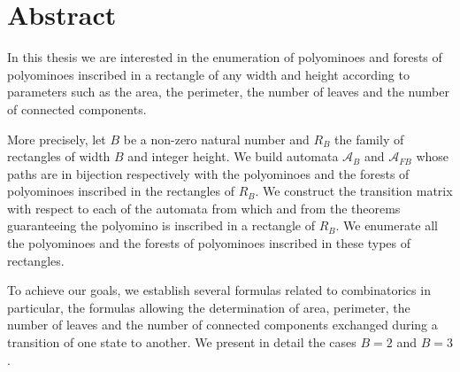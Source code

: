 \chapter*{Abstract}
In this thesis we are interested in the enumeration of polyominoes and forests of polyominoes inscribed in a rectangle of any width and height according to parameters such as the area, the perimeter, the number of leaves and the number of connected components.

 More precisely, let $B$ be a non-zero natural number and $R_{B}$ the family of rectangles of width $B$ and  integer height. We build automata $\mathcal{A}_{B}$ and $\mathcal{A}_{FB}$ whose paths are in bijection respectively with the polyominoes and the forests of polyominoes inscribed in the rectangles of $R_{ B}$. We construct the transition matrix with respect to each of the automata from which and from the theorems guaranteeing the polyomino is inscribed in a rectangle of $R_{B}$. We enumerate all the polyominoes and the forests of polyominoes inscribed in these types of rectangles. 
 
 To achieve our goals, we establish several formulas related to combinatorics in particular, the formulas allowing the determination of area, perimeter, the number of leaves and the number of connected components exchanged during a transition of one state to another. We present in detail the cases $B=2$ and $B=3$.